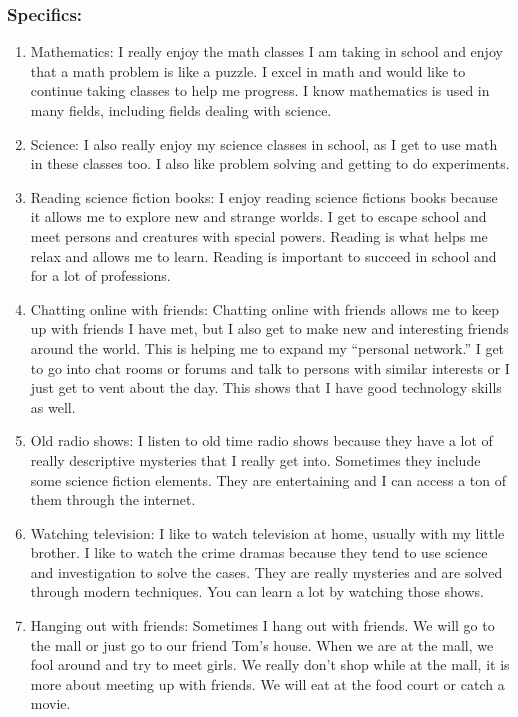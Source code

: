 \subsubsection*{Specifics:}
\begin{enumerate}[leftmargin=1cm]
	\item Mathematics: I really enjoy the math classes I am taking in school and enjoy that a math problem is like a puzzle. I excel in math and would like to continue taking classes to help me progress. I know mathematics is used in many fields, including fields dealing with science.
	\item Science: I also really enjoy my science classes in school, as I get to use math in these classes too. I also like problem solving and getting to do experiments.
	\item Reading science fiction books: I enjoy reading science fictions books because it allows me to explore new and strange worlds. I get to escape school and meet persons and creatures with special powers. Reading is what helps me relax and allows me to learn. Reading is important to succeed in school and for a lot of professions.
	\item Chatting online with friends: Chatting online with friends allows me to keep up with friends I have met, but I also get to make new and interesting friends around the world. This is helping me to expand my ``personal network.'' I get to go into chat rooms or forums and talk to persons with similar interests or I just get to vent about the day. This shows that I have good technology skills as well.
	\item Old radio shows: I listen to old time radio shows because they have a lot of really descriptive mysteries that I really get into. Sometimes they include some science fiction elements. They are entertaining and I can access a ton of them through the internet.
	\item Watching television: I like to watch television at home, usually with my little brother. I like to watch the crime dramas because they tend to use science and investigation to solve the cases. They are really mysteries and are solved through modern techniques. You can learn a lot by watching those shows.
	\item Hanging out with friends: Sometimes I hang out with friends. We will go to the mall or just go to our friend Tom's house. When we are at the mall, we fool around and try to meet girls. We really don't shop while at the mall, it is more about meeting up with friends. We will eat at the food court or catch a movie.

\end{enumerate}
